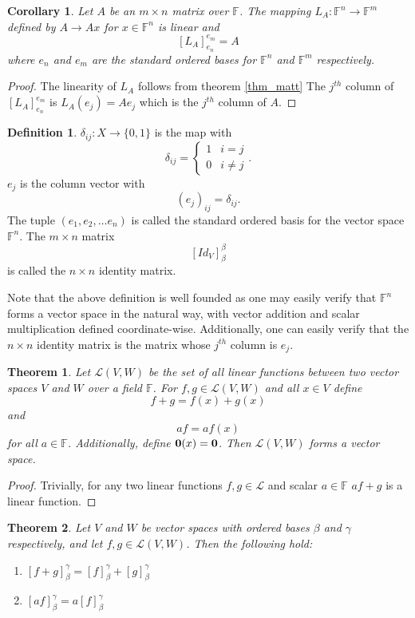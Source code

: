 \documentclass[oneside, 12pt]{book}
\newtheorem{thm}{Theorem}[section]
\newtheorem{cor}{Corollary}[section]
\theoremstyle{definition}
\newtheorem{defn}{Definition}[section]
\begin{document}
\begin{cor}
\label{cor_leftmult}
  Let $A$ be an $m \times n$ matrix over $\mathbb{F}$.
The mapping $L_{A}: \mathbb{F}^{n}\to \mathbb{F}^{m}$ defined by $A \to Ax$ for $x \in \mathbb{F}^{n}$ is linear and \[[L_{A}]_{e_{n}}^{e_{m}}=A\] where $e_{n}$ and $e_{m}$ are the standard ordered bases for $\mathbb{F}^{n}$ and $\mathbb{F}^{m}$ respectively.
\end{cor}
\begin{proof}
  The linearity of $L_{A}$ follows from theorem \ref{thm_matt} The $j^{th}$ column of $[L_{A}]_{e_{n}}^{e_{m}}$ is $L_{A}(e_{j})=Ae_{j}$ which is the $j^{th}$ column of $A$.
\end{proof}
\begin{defn}
\label{defn_id}
  $\delta_{ij}:X \to \{0,1\}$ is the map with \[\delta_{ij}=
  \begin{cases}
    1 & i=j \\
    0 & i\neq j
  \end{cases}.\]
$e_{j}$ is the column vector with \[(e_{j})_{ij}=\delta_{ij}.\]
The tuple $(e_{1}, e_{2}, \dots e_{n})$ is called the standard ordered basis for the vector space $\mathbb{F}^{n}$. The $m \times n$ matrix \[[Id_{V}]_{\beta}^{\beta}\] is called the $n \times n$ identity matrix.

\end{defn}
Note that the above definition is well founded as one may easily verify that $\mathbb{F}^{n}$ forms a vector space in the natural way, with vector addition and scalar multiplication defined coordinate-wise.
Additionally, one can easily verify that the $n \times n$ identity matrix is the matrix whose $j^{th}$ column is $e_{j}$.
\begin{thm}
\label{thm_spacelin}
  Let $\mathcal{L}(V,W)$ be the set of all linear functions between two vector spaces $V$ and $W$ over a field $\mathbb{F}$. For $f,g \in \mathcal{L}(V,W)$ and all $x \in V$ define \[f+g=f(x)+g(x)\] and \[af=af(x)\] for all $a \in \mathbb{F}$. Additionally, define $\bold{0}(x)=\bold{0}$. Then $\mathcal{L}(V,W)$ forms a vector space.
\end{thm}
\begin{proof}
Trivially, for any two linear functions $f,g \in \mathcal{L}$ and scalar $a \in \mathbb{F}$ $af+g$ is a linear function.
\end{proof}
\begin{thm}
\label{thm_matsum}
  Let $V$ and $W$ be vector spaces with ordered bases $\beta$ and $\gamma$ respectively, and let $f,g \in \mathcal{L}(V,W)$. Then the following hold:
  \begin{enumerate}
          \item $[f+g]_{\beta}^{\gamma}=[f]_{\beta}^{\gamma}+[g]_{\beta}^{\gamma}$
          \item $[af]_{\beta}^{\gamma}=a[f]_{\beta}^{\gamma}$
  \end{enumerate}
\end{thm}
\end{document}
